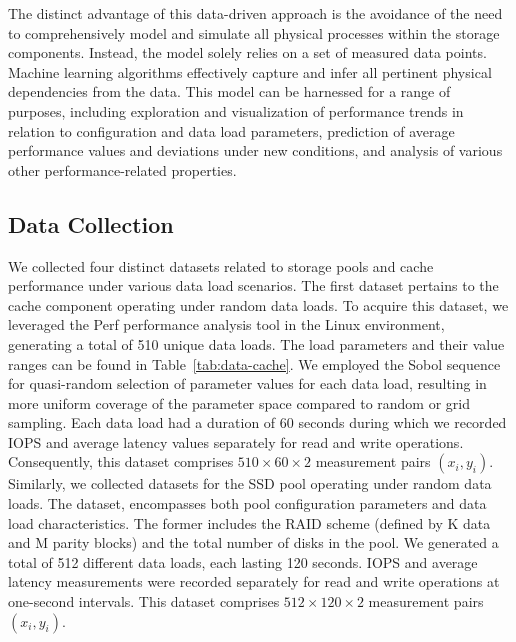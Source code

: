     The distinct advantage of this data-driven approach is the avoidance of the need to comprehensively model and simulate all physical processes within the storage components. Instead, the model solely relies on a set of measured data points. Machine learning algorithms effectively capture and infer all pertinent physical dependencies from the data. This model can be harnessed for a range of purposes, including exploration and visualization of performance trends in relation to configuration and data load parameters, prediction of average performance values and deviations under new conditions, and analysis of various other performance-related properties.
    \subsection{Data Collection}
    We collected four distinct datasets related to storage pools and cache performance under various data load scenarios. The first dataset pertains to the cache component operating under random data loads. To acquire this dataset, we leveraged the Perf performance analysis tool in the Linux environment, generating a total of 510 unique data loads. The load parameters and their value ranges can be found in Table~\ref{tab:data-cache}. We employed the Sobol sequence for quasi-random selection of parameter values for each data load, resulting in more uniform coverage of the parameter space compared to random or grid sampling. Each data load had a duration of 60 seconds during which we recorded IOPS and average latency values separately for read and write operations. Consequently, this dataset comprises $510\times60\times2$ measurement pairs $(x_i, y_i)$.
    Similarly, we collected datasets for the SSD pool operating under random data loads. The dataset, encompasses both pool configuration parameters and data load characteristics. The former includes the RAID scheme (defined by K data and M parity blocks) and the total number of disks in the pool. We generated a total of 512 different data loads, each lasting 120 seconds. IOPS and average latency measurements were recorded separately for read and write operations at one-second intervals. This dataset comprises $512\times120\times2$ measurement pairs $(x_i, y_i)$.
    
